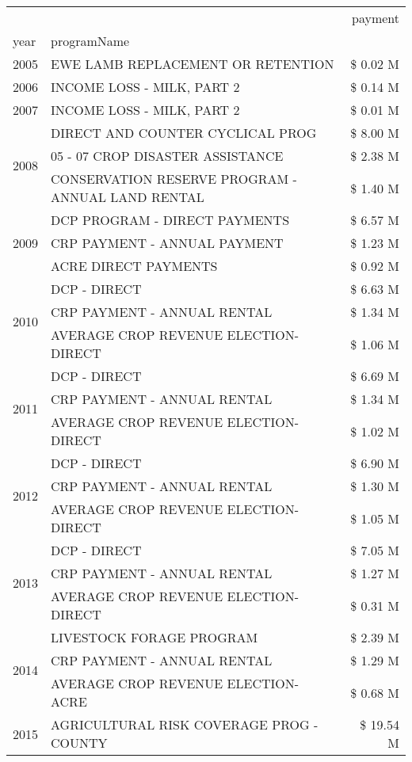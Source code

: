 \begin{tabular}{llr}
\toprule
 &  & payment \\
year & programName &  \\
\midrule
2005 & EWE LAMB REPLACEMENT OR RETENTION & \$ 0.02 M \\
\cline{1-3}
2006 & INCOME LOSS - MILK, PART 2 & \$ 0.14 M \\
\cline{1-3}
2007 & INCOME LOSS - MILK, PART 2 & \$ 0.01 M \\
\cline{1-3}
\multirow[t]{3}{*}{2008} & DIRECT AND COUNTER CYCLICAL PROG & \$ 8.00 M \\
 & 05 - 07 CROP DISASTER ASSISTANCE & \$ 2.38 M \\
 & CONSERVATION RESERVE PROGRAM - ANNUAL LAND RENTAL & \$ 1.40 M \\
\cline{1-3}
\multirow[t]{3}{*}{2009} & DCP PROGRAM - DIRECT PAYMENTS & \$ 6.57 M \\
 & CRP PAYMENT - ANNUAL PAYMENT & \$ 1.23 M \\
 & ACRE DIRECT PAYMENTS & \$ 0.92 M \\
\cline{1-3}
\multirow[t]{3}{*}{2010} & DCP - DIRECT & \$ 6.63 M \\
 & CRP PAYMENT - ANNUAL RENTAL & \$ 1.34 M \\
 & AVERAGE CROP REVENUE ELECTION-DIRECT & \$ 1.06 M \\
\cline{1-3}
\multirow[t]{3}{*}{2011} & DCP - DIRECT & \$ 6.69 M \\
 & CRP PAYMENT - ANNUAL RENTAL & \$ 1.34 M \\
 & AVERAGE CROP REVENUE ELECTION-DIRECT & \$ 1.02 M \\
\cline{1-3}
\multirow[t]{3}{*}{2012} & DCP - DIRECT & \$ 6.90 M \\
 & CRP PAYMENT - ANNUAL RENTAL & \$ 1.30 M \\
 & AVERAGE CROP REVENUE ELECTION-DIRECT & \$ 1.05 M \\
\cline{1-3}
\multirow[t]{3}{*}{2013} & DCP - DIRECT & \$ 7.05 M \\
 & CRP PAYMENT - ANNUAL RENTAL & \$ 1.27 M \\
 & AVERAGE CROP REVENUE ELECTION-DIRECT & \$ 0.31 M \\
\cline{1-3}
\multirow[t]{3}{*}{2014} & LIVESTOCK FORAGE PROGRAM & \$ 2.39 M \\
 & CRP PAYMENT - ANNUAL RENTAL & \$ 1.29 M \\
 & AVERAGE CROP REVENUE ELECTION-ACRE & \$ 0.68 M \\
\cline{1-3}
\multirow[t]{3}{*}{2015} & AGRICULTURAL RISK COVERAGE PROG - COUNTY & \$ 19.54 M \\

\end{tabular}
